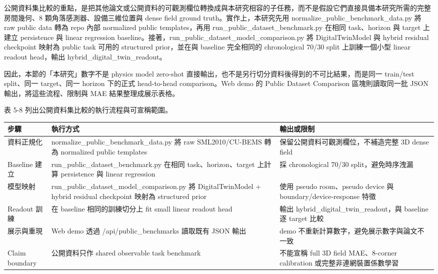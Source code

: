\documentclass[12pt,a4paper]{article}
\begin{document}
公開資料集比較的重點，是把其他論文或公開資料的可觀測欄位轉換成與本研究相容的子任務，而不是假設它們直接具備本研究所需的完整房間幾何、8 顆角落感測器、設備三維位置與 dense field ground truth。實作上，本研究先用 normalize\_\allowbreak{}public\_\allowbreak{}benchmark\_\allowbreak{}data.py 將 raw public data 轉為 repo 內部 normalized public templates，再用 run\_\allowbreak{}public\_\allowbreak{}dataset\_\allowbreak{}benchmark.py 在相同 task、horizon 與 target 上建立 persistence 與 linear regression baseline。接著，run\_\allowbreak{}public\_\allowbreak{}dataset\_\allowbreak{}model\_\allowbreak{}comparison.py 將 DigitalTwinModel 與 hybrid residual checkpoint 映射為 public task 可用的 structured prior，並在與 baseline 完全相同的 chronological 70/30 split 上訓練一個小型 linear readout head，輸出 hybrid\_\allowbreak{}digital\_\allowbreak{}twin\_\allowbreak{}readout。


因此，本節的「本研究」數字不是 physics model zero-shot 直接輸出，也不是另行切分資料後得到的不可比結果，而是同一 train/test split、同一 target、同一 horizon 下的正式 head-to-head comparison。Web demo 的 Public Dataset Comparison 區塊則讀取同一批 JSON 輸出，將這些流程、限制與 MAE 結果整理成展示表格。


表 5-8 列出公開資料集比較的執行流程與可宣稱範圍。


\begin{table}[htbp]
\centering
\footnotesize
\renewcommand{\arraystretch}{1.25}
\begin{tabular}{|>{\raggedright\arraybackslash}p{}|>{\raggedright\arraybackslash}p{}|>{\raggedright\arraybackslash}p{}|}
\hline
\textbf{步驟} & \textbf{執行方式} & \textbf{輸出或限制} \\
\hline
資料正規化 & normalize\_\allowbreak{}public\_\allowbreak{}benchmark\_\allowbreak{}data.py 將 raw SML2010/CU-BEMS 轉為 normalized public templates & 保留公開資料可觀測欄位，不補造完整 3D dense field \\
\hline
Baseline 建立 & run\_\allowbreak{}public\_\allowbreak{}dataset\_\allowbreak{}benchmark.py 在相同 task、horizon、target 上計算 persistence 與 linear regression & 採 chronological 70/30 split，避免時序洩漏 \\
\hline
模型映射 & run\_\allowbreak{}public\_\allowbreak{}dataset\_\allowbreak{}model\_\allowbreak{}comparison.py 將 DigitalTwinModel + hybrid residual checkpoint 映射為 structured prior & 使用 pseudo room、pseudo device 與 boundary/device-response 特徵 \\
\hline
Readout 訓練 & 在 baseline 相同的訓練切分上 fit small linear readout head & 輸出 hybrid\_\allowbreak{}digital\_\allowbreak{}twin\_\allowbreak{}readout，與 baseline 逐 target 比較 \\
\hline
展示與重現 & Web demo 透過 /api/public\_\allowbreak{}benchmarks 讀取既有 JSON 輸出 & demo 不重新計算數字，避免展示數字與論文不一致 \\
\hline
Claim boundary & 公開資料只作 shared observable task benchmark & 不能宣稱 full 3D field MAE、8-corner calibration 或完整非連網裝置係數學習 \\
\hline
\end{tabular}
\end{table}
\end{document}
